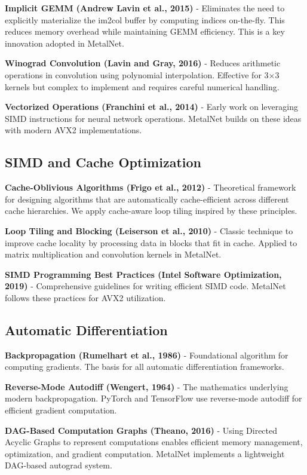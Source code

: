 \documentclass[12pt,oneside,a4paper]{report}
\begin{document}
\textbf{Implicit GEMM (Andrew Lavin et al., 2015)} - Eliminates the need to explicitly materialize the im2col buffer by computing indices on-the-fly. This reduces memory overhead while maintaining GEMM efficiency. This is a key innovation adopted in MetalNet.

\textbf{Winograd Convolution (Lavin and Gray, 2016)} - Reduces arithmetic operations in convolution using polynomial interpolation. Effective for 3×3 kernels but complex to implement and requires careful numerical handling.

\textbf{Vectorized Operations (Franchini et al., 2014)} - Early work on leveraging SIMD instructions for neural network operations. MetalNet builds on these ideas with modern AVX2 implementations.

\subsection{SIMD and Cache Optimization}

\textbf{Cache-Oblivious Algorithms (Frigo et al., 2012)} - Theoretical framework for designing algorithms that are automatically cache-efficient across different cache hierarchies. We apply cache-aware loop tiling inspired by these principles.

\textbf{Loop Tiling and Blocking (Leiserson et al., 2010)} - Classic technique to improve cache locality by processing data in blocks that fit in cache. Applied to matrix multiplication and convolution kernels in MetalNet.

\textbf{SIMD Programming Best Practices (Intel Software Optimization, 2019)} - Comprehensive guidelines for writing efficient SIMD code. MetalNet follows these practices for AVX2 utilization.

\subsection{Automatic Differentiation}

\textbf{Backpropagation (Rumelhart et al., 1986)} - Foundational algorithm for computing gradients. The basis for all automatic differentiation frameworks.

\textbf{Reverse-Mode Autodiff (Wengert, 1964)} - The mathematics underlying modern backpropagation. PyTorch and TensorFlow use reverse-mode autodiff for efficient gradient computation.

\textbf{DAG-Based Computation Graphs (Theano, 2016)} - Using Directed Acyclic Graphs to represent computations enables efficient memory management, optimization, and gradient computation. MetalNet implements a lightweight DAG-based autograd system.
\end{document}

